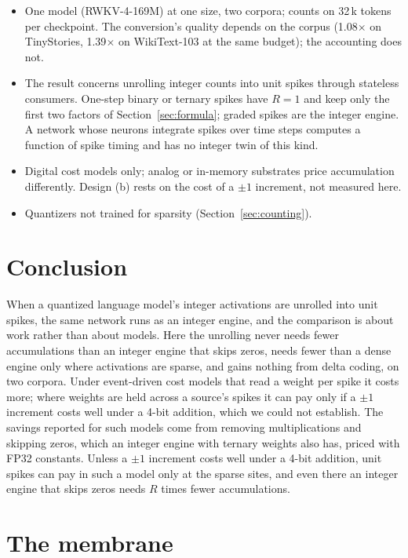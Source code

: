 \documentclass[11pt]{article}
\newcommand{\x}{$\times$}
\begin{document}
\begin{itemize}
\item One model (RWKV-4-169M) at one size, two corpora; counts on 32\,k tokens per checkpoint.
  The conversion's quality depends on the corpus (1.08\x{} on TinyStories, 1.39\x{} on
  WikiText-103 at the same budget); the accounting does not.
\item The result concerns unrolling integer counts into unit spikes through stateless consumers.
  One-step binary or ternary spikes have $R = 1$ and keep only the first two factors of
  Section~\ref{sec:formula}; graded spikes are the integer engine. A network whose neurons
  integrate spikes over time steps computes a function of spike timing and has no integer twin
  of this kind.
\item Digital cost models only; analog or in-memory substrates price accumulation differently.
  Design (b) rests on the cost of a $\pm 1$ increment, not measured here.
\item Quantizers not trained for sparsity (Section~\ref{sec:counting}).
\end{itemize}

\section{Conclusion}

When a quantized language model's integer activations are unrolled into unit spikes, the same
network runs as an integer engine, and the comparison is about work rather than about models.
Here the unrolling never needs fewer accumulations than an integer engine that skips zeros,
needs fewer than a dense engine only where activations are sparse, and gains nothing from delta
coding, on two corpora. Under event-driven cost models that read a weight per spike it costs
more; where weights are held across a source's spikes it can pay only if a $\pm 1$ increment
costs well under a 4-bit addition, which we could not establish. The savings reported for such
models come from removing multiplications and skipping zeros, which an integer engine with
ternary weights also has, priced with FP32 constants. Unless a $\pm 1$ increment costs well
under a 4-bit addition, unit spikes can pay in such a model only at the sparse sites, and even
there an integer engine that skips zeros needs $R$ times fewer accumulations.

\appendix

\section{The membrane}
\label{app:membrane}
\end{document}
